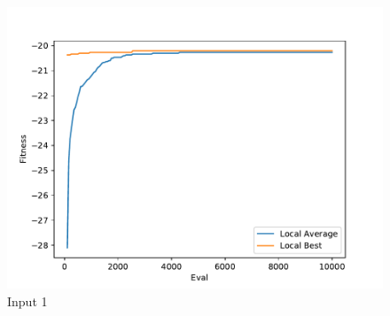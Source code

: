 \documentclass{standalone}
\begin{document}
\begin{figure}[!htb]
	\caption{Input 1}
	\label{fig:graph_1034}
	\includegraphics[width=\textwidth]{../graphs/graphs/1034.pdf}
\end{figure}
\end{document}
